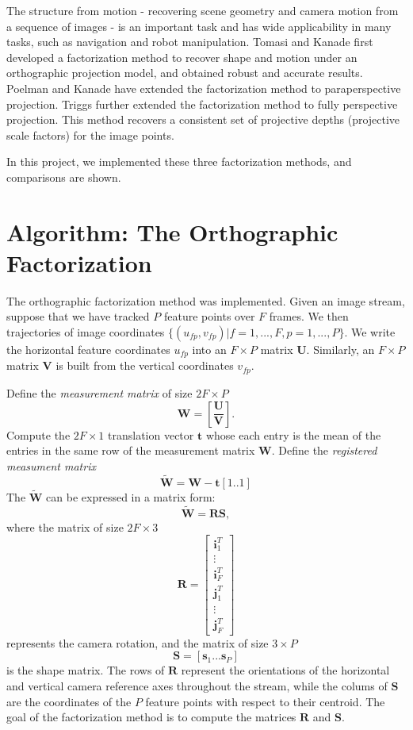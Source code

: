 The structure from motion - recovering scene geometry and camera motion from a sequence of images - is an important task and has wide applicability in many tasks, such as navigation and robot manipulation. Tomasi and Kanade \cite{Tomasi} first developed a factorization method to recover shape and motion under an orthographic projection model, and obtained robust and accurate results. Poelman and Kanade \cite{Poelman} have extended the factorization method to paraperspective projection. Triggs \cite{Triggs} further extended the factorization method to fully perspective projection. This method recovers a consistent set of projective depths (projective scale factors) for the image points.

In this project, we implemented these three factorization methods, and comparisons are shown.

\chapter{Algorithm: The Orthographic Factorization}

The orthographic factorization method \cite{Tomasi} was implemented. 
Given an image stream, suppose that we have tracked $ P $ feature points over $ F $ frames. We then trajectories of image coordinates $ \{ (u_{fp}, v_{fp}) | f = 1, ..., F, p = 1, ..., P \}. $ We write the horizontal feature coordinates $ u_{fp} $ into an $ F \times P $ matrix $ \mathbf{U}. $ Similarly, an $ F \times P $ matrix $ \mathbf{V} $ is built from the vertical coordinates $ v_{fp}. $ 

Define the \textit{measurement matrix} of size $ 2F \times P $
$$ \mathbf{W} = \left[ \frac{\mathbf{U}}{\mathbf{V}} \right]. $$
Compute the $ 2F \times 1 $ translation vector $ \mathbf{t} $ whose each entry is the mean of the entries in the same row of the measurement matrix $ \mathbf{W}. $
Define the \textit{registered measument matrix}
$$ \tilde{\mathbf{W}} = \mathbf{W} - \mathbf{t} [1 .. 1] $$
The $ \tilde{\mathbf{W}} $ can be expressed in a matrix form:
$$ \tilde{\mathbf{W}} = \mathbf{R} \mathbf{S}, $$
where the matrix of size $ 2F \times 3 $
\begin{equation}
\mathbf{R} = \left[
\begin{array}{c}
\mathbf{i}_1^T \\
\vdots \\
\mathbf{i}_F^T \\
\mathbf{j}_1^T \\
\vdots \\
\mathbf{j}_F^T 
\end{array}
\right]
\end{equation}
represents the camera rotation, and the matrix of size $ 3 \times P $
$$ \mathbf{S} = [\mathbf{s}_1  ... \mathbf{s}_P] $$
is the shape matrix. The rows of $ \mathbf{R} $ represent the orientations of the horizontal and vertical camera reference axes throughout the stream, while the colums of $ \mathbf{S} $ are the coordinates of the $ P $ feature points with respect to their centroid. 
The goal of the factorization method is to compute the matrices $ \mathbf{R} $ and $ \mathbf{S}. $

